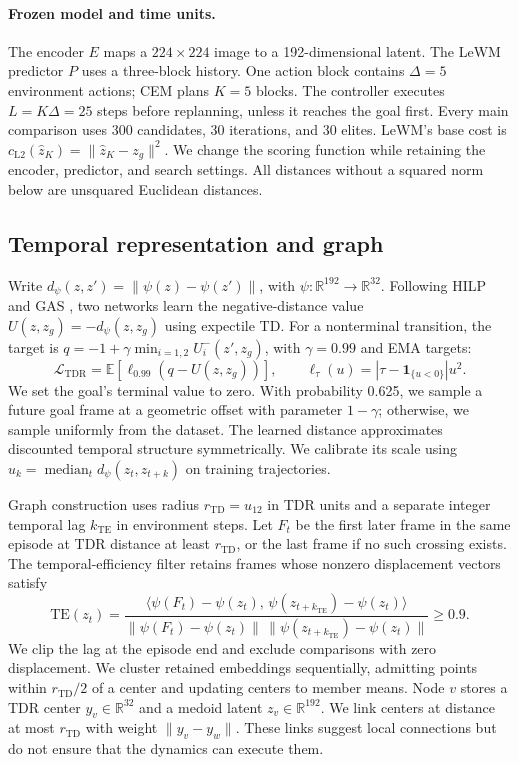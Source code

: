 \documentclass{article}
\newcommand{\Htd}{r_{\mathrm{TD}}}
\newcommand{\dd}{d_{\psi}}
\newcommand{\ind}{\mathbf{1}}
\newcommand{\EE}{\mathbb E}
\theoremstyle{definition}
\theoremstyle{remark}
\begin{document}
\paragraph{Frozen model and time units.}
The encoder $E$ maps a $224\times224$ image to a 192-dimensional latent.
The LeWM predictor $P$ uses a three-block history.
One action block contains $\Delta=5$ environment actions; CEM plans $K=5$ blocks.
The controller executes $L=K\Delta=25$ steps before replanning, unless it reaches the goal first.
Every main comparison uses 300 candidates, 30 iterations, and 30 elites.
LeWM's base cost is $c_{\mathrm{L2}}(\hat z_K)=\|\hat z_K-z_g\|^2$.
We change the scoring function while retaining the encoder, predictor, and search settings.
All distances without a squared norm below are unsquared Euclidean distances.

\subsection{Temporal representation and graph}
\label{sec:graph}
Write $\dd(z,z')=\|\psi(z)-\psi(z')\|$, with $\psi:\mathbb R^{192}\to\mathbb R^{32}$.
Following HILP and GAS \citep{hilp,gas}, two networks learn the negative-distance value
$U(z,z_g)=-\dd(z,z_g)$ using expectile TD. For a nonterminal transition, the target is
$q=-1+\gamma\min_{i=1,2}U_i^-(z',z_g)$, with $\gamma=0.99$ and EMA targets:
\begin{equation}
 \mathcal L_{\mathrm{TDR}}
 =\EE[\ell_{0.99}(q-U(z,z_g))],
 \qquad \ell_\tau(u)=|\tau-\ind_{\{u<0\}}|u^2.
 \label{eq:tdr}
\end{equation}
We set the goal's terminal value to zero. With probability 0.625, we sample a future
goal frame at a geometric offset with parameter $1-\gamma$; otherwise, we sample
uniformly from the dataset. The learned distance approximates discounted temporal
structure symmetrically. We calibrate its scale using $u_k=\operatorname{median}_t\dd(z_t,z_{t+k})$
on training trajectories.

Graph construction uses radius $\Htd=u_{12}$ in TDR units and a separate integer temporal lag
$k_{\mathrm{TE}}$ in environment steps. Let $F_t$ be the first later frame in the
same episode at TDR distance at least $\Htd$, or the last frame if no such crossing exists.
The temporal-efficiency filter retains frames whose nonzero displacement vectors satisfy
\begin{equation}
 \mathrm{TE}(z_t)=
 \frac{\langle\psi(F_t)-\psi(z_t),\,\psi(z_{t+k_{\mathrm{TE}}})-\psi(z_t)\rangle}
 {\|\psi(F_t)-\psi(z_t)\|\,\|\psi(z_{t+k_{\mathrm{TE}}})-\psi(z_t)\|}
 \ge 0.9 .
 \label{eq:te}
\end{equation}
We clip the lag at the episode end and exclude comparisons with zero displacement.
We cluster retained embeddings sequentially, admitting points within $\Htd/2$ of a center
and updating centers to member means. Node $v$ stores a TDR center $y_v\in\mathbb R^{32}$
and a medoid latent $z_v\in\mathbb R^{192}$.
We link centers at distance at most $\Htd$ with weight $\|y_v-y_w\|$.
These links suggest local connections but do not ensure that the dynamics can execute them.
\end{document}
